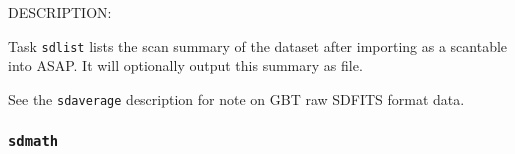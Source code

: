     DESCRIPTION:
    
    Task {\tt sdlist} lists the scan summary of the dataset after importing
    as a scantable into ASAP.  It will optionally output this summary
    as file.
    

    See the {\tt sdaverage} description for note on GBT raw SDFITS format data.

\subsubsection{{\tt sdmath}}
\label{section:sd.sdtasks.tasks.sdmath}

